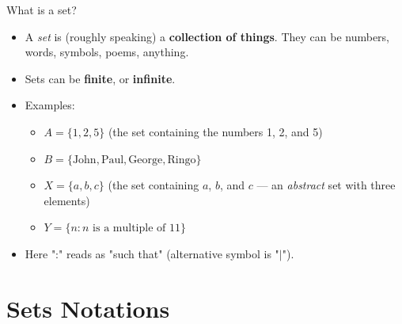 \documentclass[11pt,aspectratio=1610]{beamer}
\begin{document}
\begin{frame}{What is a set?}
	\begin{itemize}\itemsep3mm
		
		\item A \emph{set} is (roughly speaking) a \textbf{collection of things}. They can be numbers, words, symbols, poems, anything. \p
		
		\item Sets can be \textbf{finite}, or \textbf{infinite}. \p 
		
		\item Examples: \p
		\begin{itemize}\itemsep2mm
			\item $A = \{1, 2, 5\}$ (the set containing the numbers 1, 2, and 5) \p
			\item $B = \{\textrm{John}, \textrm{Paul}, \textrm{George}, \textrm{Ringo}\}$ \p
			\item $X = \{a,b,c\}$ (the set containing $a$, $b$, and $c$ --- an \emph{abstract} set with three elements) \p
			\item $Y = \{n : n \textrm{ is a multiple of } 11\}$
		\end{itemize}
		\item Here ":" reads as "such that" (alternative symbol is "$|$").
	\end{itemize}
\end{frame}


\section{Sets Notations}
\end{document}
